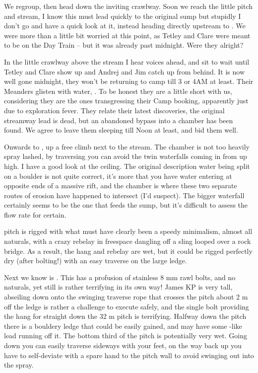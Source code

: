 We regroup, then head down the inviting crawlway. Soon we reach the
little pitch and stream, I know this must lead quickly to the original
 sump but stupidly I don't go and have a quick look at it,
instead heading directly upstream to . We were more
than a little bit worried at this point, as Tetley and Clare were meant
to be on the Day Train -- but it was already past midnight. Were they
alright?

In the little crawlway above the stream I hear voices ahead, and sit to
wait until Tetley and Clare show up and Andrej and Jim catch up from
behind. It is now well gone midnight, they won't be returning to camp
till 3 or 4AM at least. Their Meanders glisten with water, . To
be honest they are a little short with us, considering they are the ones
transgressing their Camp  booking, apparently just due to
exploration fever. They relate their latest discoveries, the original
streamway lead is dead, but an abandoned bypass into a chamber has been
found. We agree to leave them sleeping till Noon at least, and bid them
well.

Onwards to , up a free climb next to the stream. The
chamber is not too heavily spray lashed, by traversing you can avoid the
twin waterfalls coming in from up high. I have a good look at the
ceiling. The original description water being split on a boulder is not
quite correct, it's more that you have water entering at opposite ends
of a massive rift, and the  chamber is where these two
separate routes of erosion have happened to intersect (I'd suspect). The
bigger waterfall certainly seems to be the one that feeds the 
sump, but it's difficult to assess the flow rate for certain.

 pitch is rigged with what must have clearly been a
speedy minimalism, almost all naturals, with a crazy rebelay in
freespace dangling off a sling looped over a rock bridge. As a result,
the hang and rebelay are wet, but it could be rigged perfectly dry
(after bolting!) with an easy traverse on the large ledge.

Next we know is . This has a profusion of stainless 8 mm
rawl bolts, and no naturals, yet still is rather terrifying in its own
way! James KP is very tall, abseiling down onto the swinging traverse
rope that crosses the pitch about 2 m off the ledge is rather a
challenge to execute safely, and the single bolt providing the hang for
straight down the 32 m pitch is terrifying. Halfway down the pitch there
is a bouldery ledge that could be easily gained, and may have some
-like lead running off it. The bottom third of the pitch
is potentially very wet. Going down you can easily traverse sideways
with your feet, on the way back up you have to self-deviate with a spare
hand to the pitch wall to avoid swinging out into the spray.

